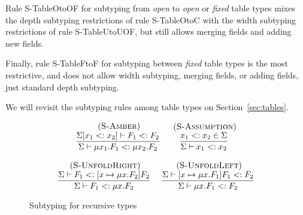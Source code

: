 \documentclass[preprint]{sigplanconf}
\newcommand{\mylabel}[1]{\; (\textsc{#1})}
\newcommand{\senv}{\Sigma}
\newcommand{\subtype}{<:}
\begin{document}
Rule {\sc S-TableOtoOF} for subtyping from {\em open} to {\em open} or {\em fixed} table types mixes the depth subtyping restrictions of rule {\sc S-TableOtoC} with the width subtyping restrictions of rule {\sc S-TableUtoUOF}, but still allows merging fields and adding new fields.

Finally, rule {\sc S-TableFtoF} for subtyping between {\em fixed} table types is the most restrictive, and does not allow width
subtyping, merging fields, or adding fields, just standard
depth subtyping.

We will revisit the subtyping rules among table types on
Section~\ref{sec:tables}.

\begin{figure}[t]
\[
\begin{array}{c}
\begin{array}{c}
\mylabel{S-Amber}\\
\dfrac{\senv[x_{1} \subtype x_{2}] \vdash F_{1} \subtype F_{2}}
{\senv \vdash \mu x_{1}.F_{1} \subtype \mu x_{2}.F_{2}}
\end{array}
\;
\begin{array}{c}
\mylabel{S-Assumption}\\
\dfrac{x_{1} \subtype x_{2} \in \senv}
{\senv \vdash x_{1} \subtype x_{2}}
\end{array}\\\\
\begin{array}{c}
\mylabel{S-UnfoldRight}\\
\dfrac{\senv \vdash F_{1} \subtype [x \mapsto \mu x.F_{2}]F_{2}}
{\senv \vdash F_{1} \subtype \mu x.F_{2}}
\end{array}
\;
\begin{array}{c}
\mylabel{S-UnfoldLeft}\\
\dfrac{\senv \vdash [x \mapsto \mu x.F_{1}]F_{1} \subtype F_{2}}
{\senv \vdash \mu x.F_{1} \subtype F_{2}}
\end{array}
\end{array}
\]
\caption{Subtyping for recursive types}
\label{fig:subrec}
\end{figure}
\end{document}

